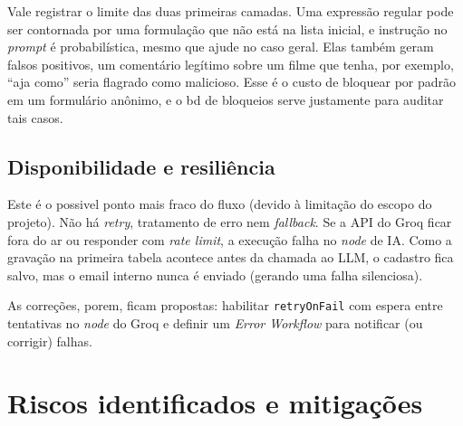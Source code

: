 \documentclass[article,11pt,oneside,a4paper,brazil,section=TITLE]{abntex2}
\begin{document}
Vale registrar o limite das duas primeiras camadas. Uma expressão regular pode ser contornada por uma formulação que não está na lista inicial, e instrução no \emph{prompt} é probabilística, mesmo que ajude no caso geral. Elas também geram falsos positivos, um comentário legítimo sobre um filme que tenha, por exemplo, ``aja como'' seria flagrado como malicioso. Esse é o custo de bloquear por padrão em um formulário anônimo, e o bd de bloqueios serve justamente para auditar tais casos.

\subsection{Disponibilidade e resiliência}

Este é o possivel ponto mais fraco do fluxo (devido à limitação do escopo do projeto). Não há \emph{retry}, tratamento de erro nem \emph{fallback}. Se a API do Groq ficar fora do ar ou responder com \emph{rate limit}, a execução falha no \emph{node} de IA. Como a gravação na primeira tabela acontece antes da chamada ao LLM, o cadastro fica salvo, mas o email interno nunca é enviado (gerando uma falha silenciosa).

As correções, porem, ficam propostas: habilitar \texttt{retryOnFail} com espera entre tentativas no \emph{node} do Groq e definir um \emph{Error Workflow} para notificar (ou corrigir) falhas.

\section{Riscos identificados e mitigações}
\end{document}
